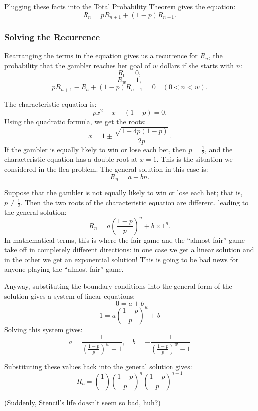 \documentclass[12pt,a4paper]{article}
\begin{document}
		Plugging these facts into the Total Probability Theorem gives the equation:
		\[
		R_n = p R_{n+1} + (1 - p) R_{n-1}.
		\]
		
		\subsubsection{Solving the Recurrence}
		
		Rearranging the terms in the equation gives us a recurrence for $R_n$, the probability that the gambler reaches her goal of $w$ dollars if she starts with $n$:
		\[
		R_0 = 0,
		\]
		\[
		R_w = 1,
		\]
		\[
		p R_{n+1} - R_n + (1 - p) R_{n-1} = 0 \quad (0 < n < w).
		\]
		
		The characteristic equation is:
		\[
		p x^2 - x + (1 - p) = 0.
		\]
		Using the quadratic formula, we get the roots:
		\[
		x = 1 \pm \frac{\sqrt{1 - 4p(1 - p)}}{2p}.
		\]
		If the gambler is equally likely to win or lose each bet, then $p = \frac{1}{2}$, and the characteristic equation has a double root at $x = 1$. This is the situation we considered in the flea problem. The general solution in this case is:
		\[
		R_n = a + b n.
		\]
		
		Suppose that the gambler is not equally likely to win or lose each bet; that is, $p \neq \frac{1}{2}$. Then the two roots of the characteristic equation are different, leading to the general solution:
		\[
		R_n = a \left( \frac{1 - p}{p} \right)^n + b\times 1^n.
		\]
		In mathematical terms, this is where the fair game and the ``almost fair'' game take off in completely different directions: in one case we get a linear solution and in the other we get an exponential solution! This is going to be bad news for anyone playing the ``almost fair'' game.
		
		Anyway, substituting the boundary conditions into the general form of the solution gives a system of linear equations:
		\[
		0 = a + b
		\]
		\[
		1 = a \left(\frac{1-p}{p} \right)^w + b
		\]
		Solving this system gives:
		\[
		a = \frac{1}{\left( \frac{1-p}{p} \right)^w - 1}, \quad b =- \frac{1}{\left(\frac{1-p}{p} \right)^w - 1}
		\]
		
		Substituting these values back into the general solution gives:
		\[
		R_n =\left(\frac{1}{}\right) \left( \frac{1-p}{p} \right)^n \left( \frac{1-p}{p} \right)^{n - 1}
		\]
		
		(Suddenly, Stencil's life doesn't seem so bad, huh?)
\end{document}
